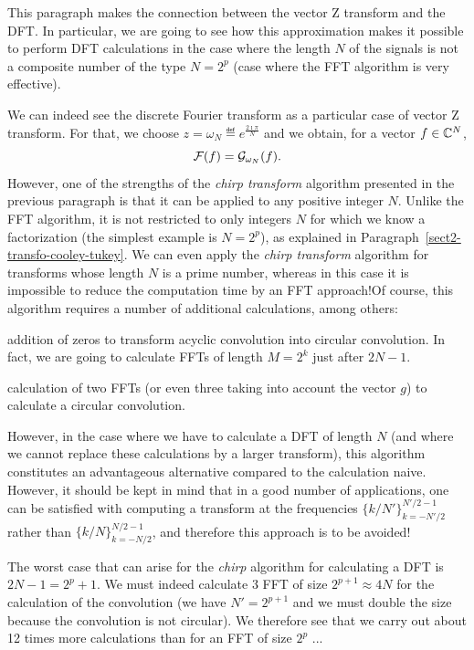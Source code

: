  
This paragraph makes the connection between the vector Z transform and the DFT. In particular, we are going to see how this approximation makes it possible to perform DFT calculations in the case where the length $ N $ of the signals is not a composite number of the type $ N = 2^p $ (case where the FFT algorithm is very effective).
 
 
  We can indeed see the discrete Fourier transform as a particular case of vector Z transform. For that, we choose $ z = \omega_N \eqdef e^{\frac{2 \imath \pi}{N}} $ and we obtain, for a vector $ f \in \mathbb{C}^N $,
\begin{equation*}
\mathcal{F}(f) = \mathcal{G}_{\omega_N} (f).
\end{equation*}
However, one of the strengths of the \textit{chirp transform} algorithm presented in the previous paragraph is that it can be applied to any positive integer $ N $. Unlike the FFT algorithm, it is not restricted to only integers $ N $ for which we know a  factorization (the simplest example is $ N = 2^p $), as explained in Paragraph~\ref{sect2-transfo-cooley-tukey}. We can even apply the \textit{chirp transform} algorithm for transforms whose length $ N $ is a prime number, whereas in this case it is impossible to reduce the computation time by an FFT approach!Of course, this algorithm requires a number of additional calculations, among others: \begin{rs}
\item {}  addition of zeros to transform acyclic convolution into circular convolution. In fact, we are going to calculate FFTs of length $ M = 2^k $ just after $ 2 N-1 $.
\item calculation of two FFTs (or even three taking into account the vector $ g $) to calculate a circular convolution.
\end{rs} However, in the case where we have to calculate a DFT of length $ N $ (and where we cannot replace these calculations by a larger transform), this algorithm constitutes an advantageous alternative compared to the calculation naive. However, it should be kept in mind that in a good number of applications, one can be satisfied with computing a transform at the frequencies $ \{k / N'\}_{k = -N' / 2}^{N'/ 2-1} $ rather than $ \{k / N \}_{k = -N / 2}^{N / 2-1} $, and therefore this approach is to be avoided!
 
\begin{rem}
The worst case that can arise for the \textit{chirp} algorithm for calculating a DFT is $ 2N-1 = 2^p + 1 $. We must indeed calculate 3 FFT of size $ 2^{p + 1} \approx 4N $ for the calculation of the convolution (we have $ N'= 2^{p + 1} $ and we must double the size because the convolution is not circular). We therefore see that we carry out about 12 times more calculations than for an FFT of size $ 2^p $ ...
\end{rem}
 

